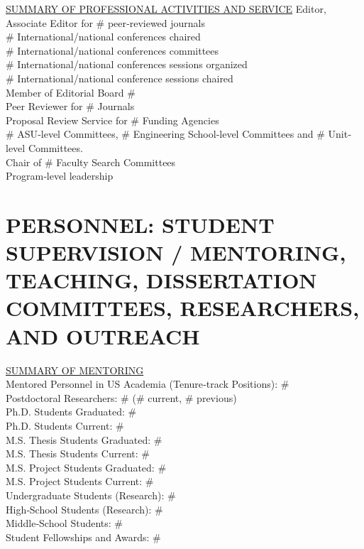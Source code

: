 \documentclass[11pt,letterpaper,sans]{moderncv}
\begin{document}
\begin{framed}
  \underline{SUMMARY OF PROFESSIONAL ACTIVITIES AND SERVICE}
  Editor, Associate Editor for \# peer‐reviewed journals \\
  \# International/national conferences chaired \\
  \# International/national conferences committees \\
  \# International/national conferences sessions organized \\
  \# International/national conference sessions chaired \\
  Member of Editorial Board \# \\
  Peer Reviewer for \# Journals \\
  Proposal Review Service for \# Funding Agencies \\
  \# ASU‐level Committees, \# Engineering School‐level Committees and \# Unit‐level Committees. \\
  Chair of \# Faculty Search Committees \\
  Program‐level leadership
\end{framed}

\section{PERSONNEL: STUDENT SUPERVISION / MENTORING, TEACHING, DISSERTATION COMMITTEES, RESEARCHERS, AND OUTREACH}

\begin{framed}
  \underline{SUMMARY OF MENTORING} \\
  Mentored Personnel in US Academia (Tenure‐track Positions): \# \\
  Postdoctoral Researchers: \# (\# current, \# previous) \\
  Ph.D. Students Graduated: \# \\
  Ph.D. Students Current: \# \\
  M.S. Thesis Students Graduated: \# \\
  M.S. Thesis Students Current: \# \\
  M.S. Project Students Graduated: \# \\
  M.S. Project Students Current: \# \\
  Undergraduate Students (Research): \# \\
  High‐School Students (Research): \# \\
  Middle‐School Students: \# \\
  Student Fellowships and Awards: \#  \\
\end{framed}
\end{document}

